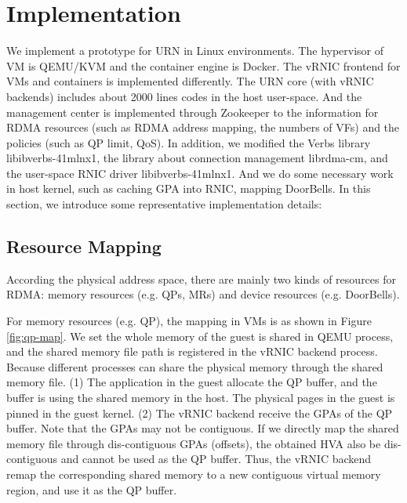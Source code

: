 \section{Implementation}
 We implement a prototype for URN in Linux environments. The hypervisor of VM is QEMU/KVM and the container engine is Docker. The vRNIC frontend for VMs and containers is implemented differently. The URN core (with vRNIC backends) includes about 2000 lines codes in the host user-space. And the management center is implemented through Zookeeper to the information for RDMA resources (such as RDMA address mapping, the numbers of VFs) and the policies (such as QP limit, QoS). In addition, we modified the Verbs library libibverbs-41mlnx1, the library about connection management librdma-cm, and the user-space RNIC driver libibverbs-41mlnx1. And we do some necessary work in host kernel, such as caching GPA into RNIC, mapping DoorBells. In this section, we introduce some representative implementation details:
 
 \subsection{Resource Mapping}
According the physical address space, there are mainly two kinds of resources for RDMA: memory resources (e.g. QPs, MRs) and device resources (e.g. DoorBells). 
 
 For memory resources (e.g. QP), the mapping in VMs is as shown in Figure \ref{fig:qp-map}. We set the whole memory of the guest is shared in QEMU process, and the shared memory file path is registered in the vRNIC backend process. Because different processes can share the physical memory through the shared memory file. (1) The application in the guest allocate the QP buffer, and the buffer is using the shared memory in the host. The physical pages in the guest is pinned in the guest kernel. (2) The vRNIC backend receive the GPAs of the QP buffer. Note that the GPAs may not be contiguous. If we directly map the shared memory file through dis-contiguous GPAs (offsets), the obtained HVA also be dis-contiguous and cannot be used as the QP buffer. Thus, the vRNIC backend remap the corresponding shared memory to a new contiguous virtual memory region, and use it as the QP buffer.
 
